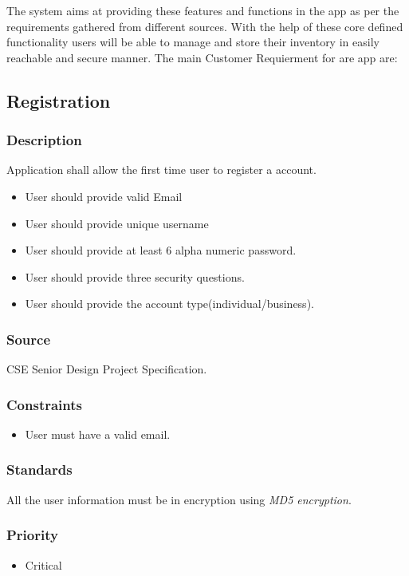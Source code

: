 The system aims at providing these features and functions in the app as per the requirements gathered from different sources. With the help of these core defined functionality users will be able to manage and store their inventory in easily reachable and secure manner. The main Customer Requierment for are app are:

\subsection{Registration}
\subsubsection{Description}
Application shall allow the first time user to register a account.
\begin{itemize}
\item User should provide valid Email
\item User should provide unique username
\item User should provide at least 6 alpha numeric password.
\item User should provide three security questions.
\item User should provide the account type(individual/business).
\end{itemize}

\subsubsection{Source}
CSE Senior Design Project Specification.
\subsubsection{Constraints}
\begin{itemize}
\item User must have a valid email. 
\end{itemize}

\subsubsection{Standards}
All the user information must be in encryption using \textit{MD5 encryption}.
\subsubsection{Priority}

\begin{itemize}
\item Critical\\ \\
\end{itemize}

